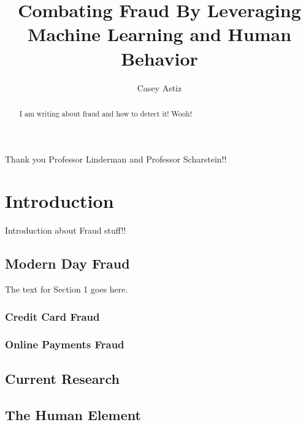 \documentclass[midd]{thesis}
\title {Combating Fraud By Leveraging Machine Learning and Human Behavior}
\author {Casey Astiz}
\begin{document}
\maketitle
{}

\begin{abstract}
I am writing about fraud and how to detect it! Wooh!
\end{abstract}

\begin{acknowledgements}
Thank you Professor Linderman and Professor Scharstein!!
\end{acknowledgements}

\contentspage
\tablelistpage   %
\figurelistpage

\normalspacing \setcounter{page}{1} 

\chapter{Introduction}
\label{sec:intro}

Introduction about Fraud stuff!!

\pagebreak

\section{Modern Day Fraud}
The text for Section 1 goes here.

\pagebreak

\subsection{Credit Card Fraud}

\pagebreak


\subsection{Online Payments Fraud}

\pagebreak

\section{Current Research}

\pagebreak

\section{The Human Element}
\end{document}
